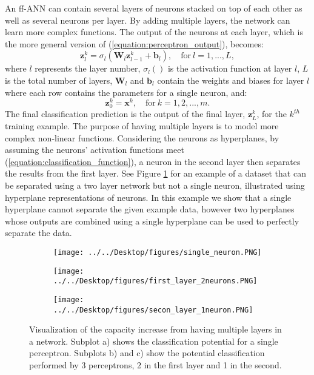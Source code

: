 \documentclass[letterpaper,12pt,titlepage,oneside,final]{book}
\begin{document}
	 An ff-ANN can contain several layers of neurons stacked on top of each other as well as several neurons per layer. By adding multiple layers, the network can learn more complex functions. The output of the neurons at each layer, which is the more general version of (\ref{equation:perceptron_output}), becomes:
	\begin{equation}
	\mathbf{z}_{l}^{k} = \sigma_{l}(\mathbf{W}_{l}\mathbf{z}_{l-1}^{k} + \mathbf{b}_{l}), \quad \text{for} \ l = 1, ... , L,
	\end{equation}
	where $l$ represents the layer number, $\sigma_{l}()$ is the activation function at layer $l$, $L$ is the total number of layers, $\mathbf{W}_{l}$ and $\mathbf{b}_{l}$ contain the weights and biases for layer $l$ where each row contains the parameters for a single neuron, and:
	\begin{equation}
	\mathbf{z}_{0}^{k} = \mathbf{x}^{k}, \quad \text{for} \ k=1, 2, ... , m.
	\end{equation}
	The final classification prediction is the output of the final layer, $\mathbf{z}_{L}^{k}$, for the $k^{th}$ training example. The purpose of having multiple layers is to model more complex non-linear functions. Considering the neurons as hyperplanes, by assuming the neurons' activation functions meet (\ref{equation:classification_function}), a neuron in the second layer then separates the results from the first layer. See Figure \ref{figure:MLP} for an example of a dataset that can be separated using a two layer network but not a single neuron, illustrated using hyperplane representations of neurons. In this example we show that a single hyperplane cannot separate the given example data, however two hyperplanes whose outputs are combined using a single hyperplane can be used to perfectly separate the data.
	\begin{figure}
		\centering
		\begin{subfigure}{.3\textwidth}
			\texttt{[image: ../../Desktop/figures/single\_neuron.PNG]}
			\caption{}
		\end{subfigure}
		\begin{subfigure}{.3\textwidth}
			\texttt{[image: ../../Desktop/figures/first\_layer\_2neurons.PNG]}
			\caption{}
		\end{subfigure}
		\begin{subfigure}{.3\textwidth}
			\texttt{[image: ../../Desktop/figures/secon\_layer\_1neuron.PNG]}
			\caption{}
		\end{subfigure}
		\caption{Visualization of the capacity increase from having multiple layers in a network. Subplot a) shows the classification potential for a single perceptron. Subplots b) and c) show the potential classification performed by 3 perceptrons, 2 in the first layer and 1 in the second.}
		\label{figure:MLP}
	\end{figure}
	
\end{document}
